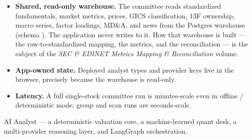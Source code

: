 \documentclass[11pt]{article}
\begin{document}
\begin{itemize}
  \item \textbf{Shared, read-only warehouse.} The committee reads standardized
        fundamentals, market metrics, prices, GICS classification, 13F ownership,
        macro series, factor loadings, MD\&A, and news from the Postgres
         warehouse (schema ). The application never
        writes to it. How that warehouse is built --- the raw-to-standardized
        mapping, the metrics, and the reconciliation --- is the subject of the
        \emph{SEC \& EDINET Metrics Mapping \& Reconciliation} volume.
  \item \textbf{App-owned state.} Deployed analyst types and provider keys live in
        the browser, precisely because the warehouse is read-only.
  \item \textbf{Latency.} A full single-stock committee run is minutes-scale even
        in offline / deterministic mode; group and scan runs are seconds-scale.
\end{itemize}

\vfill
\begin{center}\small\color{muted}
AI Analyst --- a deterministic valuation core, a machine-learned quant desk, a
multi-provider reasoning layer, and LangGraph orchestration.
\end{center}
\end{document}
